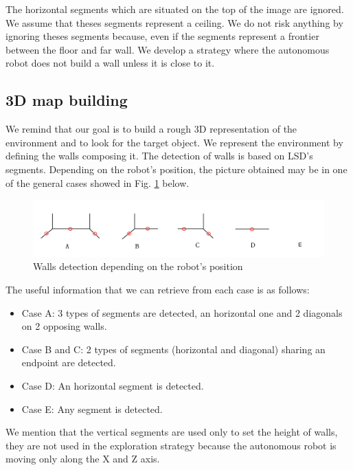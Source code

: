 \documentclass[12pt]{report}
\begin{document}
The horizontal segments which are situated on the top of the image are ignored. We assume that theses segments represent 
a ceiling. We do not risk anything by ignoring theses segments because, even if the segments represent a frontier 
between the floor and far wall. We develop a strategy where the autonomous robot does not build a wall unless it is 
close to it.

    \subsection{3D map building}
    
   
    We remind that our goal is to build a rough 3D representation of the environment and to look for the target object. 
We represent the environment by defining the walls composing it. The detection of walls is based on LSD's segments. 
 Depending on the robot's position, the picture obtained may be in one of the general cases showed in Fig. 
\ref{fig:walls} below. 
    
    
    	\begin{figure}[H]
    	\begin{center}
    		\includegraphics[scale=0.65]{res/cases_seg.png}
    		\caption{Walls detection depending on the robot's position}
    		\label{fig:walls}
    	\end{center}
    \end{figure}
 
 \newpage
 The useful information that we can retrieve from each case is as follows:
 \begin{itemize}
 	\item Case A: 3 types of segments are detected, an horizontal one and 2 diagonals on 2 opposing walls.
 	\item Case B and C: 2 types of segments (horizontal and diagonal) sharing an endpoint are detected.
 	\item Case D: An horizontal segment is detected.
 	\item Case E: Any segment is detected.
 	
 \end{itemize}
 
 We mention that the vertical segments are used only to set the height of walls, they are not used in the exploration strategy because the autonomous robot is moving only along the X and Z axis.
\end{document}
